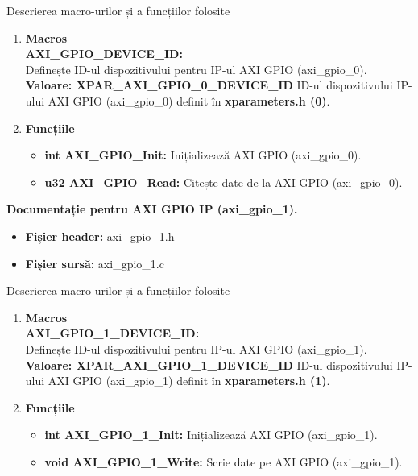 \documentclass[12pt]{article}
\begin{document}
\hspace*{1cm}Descrierea macro-urilor și a funcțiilor folosite
\begin{enumerate}
    \item \textbf{Macros}\\
    \hspace*{1cm} \textbf{AXI\_GPIO\_DEVICE\_ID:} \\
    \hspace*{1cm} Definește ID-ul dispozitivului pentru IP-ul AXI GPIO (axi\_gpio\_0).\\
    \hspace*{1cm} \textbf{Valoare: XPAR\_AXI\_GPIO\_0\_DEVICE\_ID  } ID-ul dispozitivului IP-ului AXI GPIO (axi\_gpio\_0) definit în \textbf{xparameters.h (0)}.
    \item \textbf{Funcțiile}
        \begin{itemize}
            \item \textbf{int AXI\_GPIO\_Init:} Inițializează AXI GPIO (axi\_gpio\_0).
            \item \textbf{u32 AXI\_GPIO\_Read:} Citește date de la AXI GPIO (axi\_gpio\_0).\\
        \end{itemize}
\end{enumerate}
\textbf{Documentație pentru AXI GPIO IP (axi\_gpio\_1).}
 \begin{itemize}
    \item \textbf{Fișier header:} axi\_gpio\_1.h
    \item \textbf{Fișier sursă:} axi\_gpio\_1.c\\
 \end{itemize}
\hspace*{1cm}Descrierea macro-urilor și a funcțiilor folosite
\begin{enumerate}
    \item \textbf{Macros}\\
    \hspace*{1cm} \textbf{AXI\_GPIO\_1\_DEVICE\_ID:} \\
    \hspace*{1cm} Definește ID-ul dispozitivului pentru IP-ul AXI GPIO (axi\_gpio\_1).\\
    \hspace*{1cm} \textbf{Valoare: XPAR\_AXI\_GPIO\_1\_DEVICE\_ID  } ID-ul dispozitivului IP-ului AXI GPIO (axi\_gpio\_1) definit în \textbf{xparameters.h (1)}.
    \item \textbf{Funcțiile}
        \begin{itemize}
            \item \textbf{int AXI\_GPIO\_1\_Init:} Inițializează AXI GPIO (axi\_gpio\_1).
            \item \textbf{void AXI\_GPIO\_1\_Write:} Scrie date pe AXI GPIO (axi\_gpio\_1).\\
        \end{itemize}
\end{enumerate}
\end{document}
